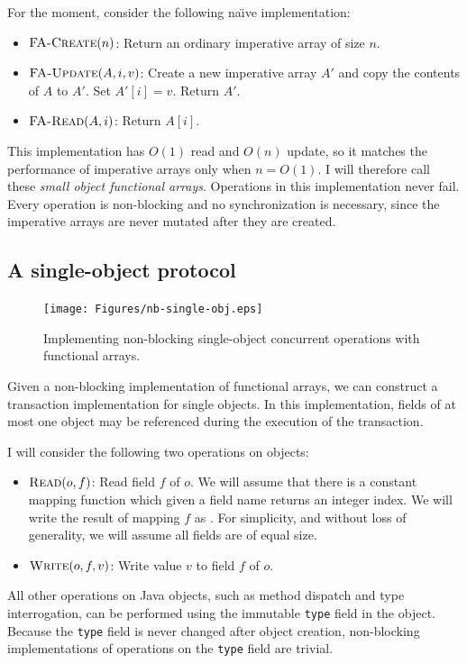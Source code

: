 For the moment, consider the following na{\"\i}ve implementation:
\begin{itemize}
\item $\text{\sc FA-Create}(n)$: Return an ordinary imperative array of size
  $n$.
\item $\text{\sc FA-Update}(A, i, v)$: Create a new imperative array
  $A'$ and copy the contents of $A$ to $A'$.  Set $A'[i]=v$. Return $A'$.
\item $\text{\sc FA-Read}(A, i)$: Return $A[i]$.
\end{itemize}
This implementation has $O(1)$ read and $O(n)$ update, so it matches
the performance of imperative arrays only when $n=O(1)$.  I will
therefore call these \emph{small object functional arrays}.  Operations
in this implementation never fail.  Every operation is non-blocking
and no synchronization is necessary, since the imperative arrays are
never mutated after they are created.

\subsection{A single-object protocol}
\begin{figure}\centering
\texttt{[image: Figures/nb-single-obj.eps]}
\caption{Implementing non-blocking single-object concurrent operations
  with functional arrays.}
\label{fig:single-o}
\end{figure}
Given a non-blocking implementation of functional arrays, we can
construct a transaction implementation for single objects.  In
this implementation, fields of at most one object may be referenced
during the execution of the transaction.

I will consider the following two operations on objects:
\begin{itemize}
\item $\text{\sc Read}(o, f)$: Read field $f$ of $o$.  We will assume that
  there is a constant mapping function which given a field name
  returns an integer index.  We will write the result of mapping $f$
  as .  For simplicity, and without loss of generality,
  we will assume all fields are of equal size.
\item $\text{\sc Write}(o, f, v)$: Write value $v$ to field $f$ of $o$.
\end{itemize}
All other operations on Java objects, such as method dispatch and type
interrogation, can be performed using the immutable {\tt type}
field in the object.  Because the {\tt type} field is never changed
after object creation, non-blocking implementations of operations on
the {\tt type} field are trivial.

